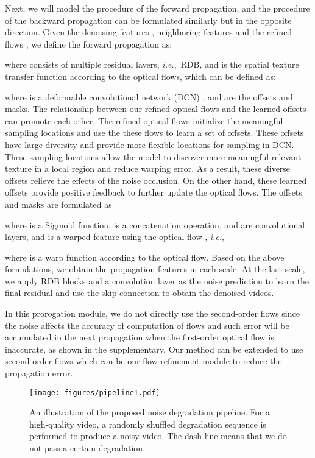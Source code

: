 \documentclass[10pt,twocolumn,letterpaper]{article}
\def\ie{\mbox{\textit{i.e.}, }}
\newlength \g
\begin{document}
Next, we will model the procedure of the forward propagation, and the procedure of the backward propagation can be formulated similarly but in the opposite direction.
Given the denoising features , neighboring features  and the refined flows , we define the forward propagation as:

where  consists of multiple residual layers, \ie RDB, and  is the spatial texture transfer function according to the optical flows, which can be defined as:

where  is a deformable convolutional network (DCN) \cite{zhu2019dcnv2},  and  are the offsets and masks. 
The relationship between our refined optical flows and the learned offsets can promote each other. 
The refined optical flows initialize the meaningful sampling locations and use the these flows to learn a set of offsets. 
These offsets have large diversity and provide more flexible locations for sampling in DCN.
These sampling locations allow the model to discover more meaningful relevant texture in a local region and reduce warping error.
As a result, these diverse offsets relieve the effects of the noise occlusion.
On the other hand, these learned offsets provide positive feedback to further update the optical flows.
The offsets and masks are formulated as

where  is a Sigmoid function,  is a concatenation operation,  and  are convolutional layers, and  is a warped feature using the optical flow , \ie 

where  is a warp function according to the optical flow.
Based on the above formulations, we obtain the propagation features in each scale.
At the last scale, we apply RDB blocks and a convolution layer as the noise prediction to learn the final residual and use the skip connection to obtain the denoised videos.

In this prorogation module, we do not directly use the second-order flows since the noise affects the accuracy of computation of flows and such error will be accumulated in the next propagation when the first-order optical flow is inaccurate, as shown in the supplementary. Our method can be extended to use second-order flows which can be our flow refinement module to reduce the propagation error.







\begin{figure*}[t]
    \begin{center}
\vspace{-0.3cm}
    \texttt{[image: figures/pipeline1.pdf]}
    \end{center}
    \vspace{-0.6cm}
    \caption{An illustration of the proposed noise degradation pipeline. 
    For a high-quality video, a randomly shuffled degradation sequence is performed to produce a noisy video. The dash line means that we do not pass a certain degradation.}
    \label{fig:pipeline}
    \vspace{-0.4cm}
\end{figure*}
\end{document}
